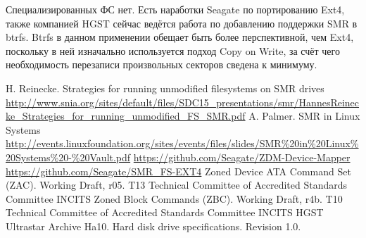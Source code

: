 \documentclass[10pt, a5paper]{article}
\begin{document}
Специализированных ФС нет. Есть наработки Seagate по портированию Ext4, также компанией HGST сейчас ведётся работа по добавлению поддержки SMR в btrfs. Btrfs в данном применении обещает быть более перспективной, чем Ext4, поскольку в ней изначально используется подход Copy on Write, за счёт чего необходимость перезаписи произвольных секторов сведена к минимуму.

\begin{thebibliography}{9}
   H. Reinecke. Strategies for running unmodified filesystems on SMR drives \url{http://www.snia.org/sites/default/files/SDC15_presentations/smr/HannesReinecke_Strategies_for_running_unmodified_FS_SMR.pdf}
   A. Palmer. SMR in Linux Systems \url{http://events.linuxfoundation.org/sites/events/files/slides/SMR\%20in\%20Linux\%20Systems\%20-\%20Vault.pdf}
   \url{https://github.com/Seagate/ZDM-Device-Mapper}
   \url{https://github.com/Seagate/SMR\_FS-EXT4}
   Zoned Device ATA Command Set (ZAC). Working Draft, r05. T13 Technical Committee of Accredited Standards Committee INCITS
   Zoned Block Commands (ZBC). Working Draft, r4b. T10 Technical Committee of Accredited Standards Committee INCITS
   HGST Ultrastar Archive Ha10. Hard disk drive specifications. Revision 1.0.
\end{thebibliography}
\end{document}
